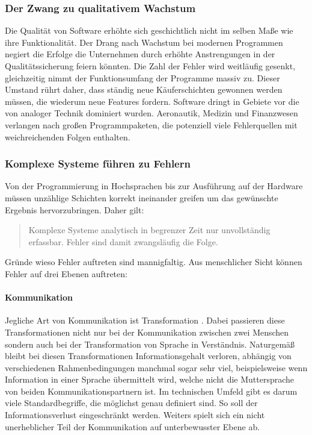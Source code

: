 \subsubsection{Der Zwang zu qualitativem Wachstum}
Die Qualität von Software erhöhte sich geschichtlich nicht im selben Maße wie ihre Funktionalität. Der Drang nach Wachstum bei modernen Programmen negiert die Erfolge die Unternehmen durch erhöhte Anstrengungen in der Qualitätssicherung feiern könnten. Die Zahl der Fehler wird weitläufig gesenkt,  gleichzeitig nimmt der Funktionsumfang der Programme massiv zu. Dieser Umstand rührt daher, dass ständig neue Käuferschichten gewonnen werden müssen, die wiederum neue Features fordern.
Software dringt in Gebiete vor die von analoger Technik dominiert wurden. Aeronautik, Medizin und Finanzwesen verlangen nach großen Programmpaketen, die potenziell viele Fehlerquellen mit weichreichenden Folgen enthalten.

\subsubsection{Komplexe Systeme führen zu Fehlern}
Von der Programmierung in Hochsprachen bis zur Ausführung auf der Hardware müssen unzählige Schichten korrekt ineinander greifen um das gewünschte Ergebnis hervorzubringen. 
Daher gilt:

\begin{quote}
Komplexe Systeme analytisch in begrenzer Zeit nur unvollständig erfassbar. Fehler sind damit zwangsläufig die Folge. \cite{vigenschow_objektorientiertes_2004}
\end{quote}

Gründe wieso Fehler auftreten sind mannigfaltig. Aus menschlicher Sicht können Fehler auf drei Ebenen auftreten: \cite{vigenschow_objektorientiertes_2004}

\paragraph{Kommunikation}
Jegliche Art von Kommunikation ist Transformation \cite{shannon_mathematische_1976}. Dabei passieren diese Transformationen nicht nur bei der Kommunikation zwischen zwei Menschen sondern auch bei der Transformation von Sprache in Verständnis. Naturgemäß bleibt bei diesen Transformationen Informationsgehalt verloren, abhängig von verschiedenen Rahmenbedingungen manchmal sogar sehr viel, beispielsweise wenn Information in einer Sprache übermittelt wird, welche nicht die Muttersprache von beiden Kommunikationspartnern ist.
Im technischen Umfeld gibt es darum viele Standardbegriffe, die möglichst genau definiert sind. So soll der Informationsverlust eingeschränkt werden.
Weiters spielt sich ein nicht unerheblicher Teil der Kommunikation auf unterbewusster Ebene ab.


